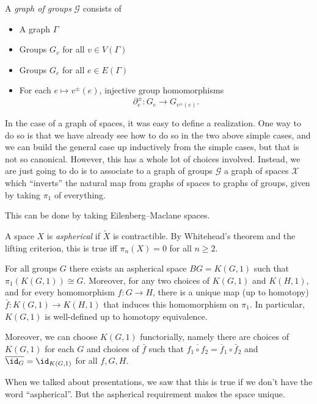 \documentclass[a4paper]{article}
\begin{document}
\begin{defi}
  A \emph{graph of groups} $\mathcal{G}$ consists of
  \begin{itemize}
    \item A graph $\Gamma$
    \item Groups $G_v$ for all $v \in V(\Gamma)$
    \item Groups $G_e$ for all $e \in E(\Gamma)$
    \item For each $e \mapsto v^{\pm}(e)$, injective group homomorphisms
      \[
        \partial_e^{\pm}: G_e \to G_{v^{\pm}(e)}.
      \]
  \end{itemize}
\end{defi}
In the case of a graph of spaces, it was easy to define a realization. One way to do so is that we have already see how to do so in the two above simple cases, and we can build the general case up inductively from the simple cases, but that is not so canonical. However, this has a whole lot of choices involved. Instead, we are just going to do is to associate to a graph of groups $\mathcal{G}$ a graph of spaces $\mathcal{X}$ which ``inverts'' the natural map from graphs of spaces to graphs of groups, given by taking $\pi_1$ of everything.

This can be done by taking Eilenberg--Maclane spaces.
\begin{defi}
  A space $X$ is \emph{aspherical} if $\tilde{X}$ is contractible. By Whitehead's theorem and the lifting criterion, this is true iff $\pi_n(X) = 0$ for all $n \geq 2$.
\end{defi}

\begin{prop}
  For all groups $G$ there exists an aspherical space $BG = K(G, 1)$ such that $\pi_1(K(G, 1)) \cong G$. Moreover, for any two choices of $K(G, 1)$ and $K(H, 1)$, and for every homomorphism $f: G \to H$, there is a unique map (up to homotopy) $\bar{f}: K(G, 1) \to K(H, 1)$ that induces this homomorphism on $\pi_1$. In particular, $K(G, 1)$ is well-defined up to homotopy equivalence.

  Moreover, we can choose $K(G, 1)$ functorially, namely there are choices of $K(G, 1)$ for each $G$ and choices of $\bar{f}$ such that $\overline{f_1 \circ f_2} = \overline{f}_1 \circ \bar{f}_2$ and $\overline{\id_{G}} = \id_{K(G, 1)}$ for all $f, G, H$.
\end{prop}
When we talked about presentations, we saw that this is true if we don't have the word ``aspherical''. But the aspherical requirement makes the space unique.
\end{document}
